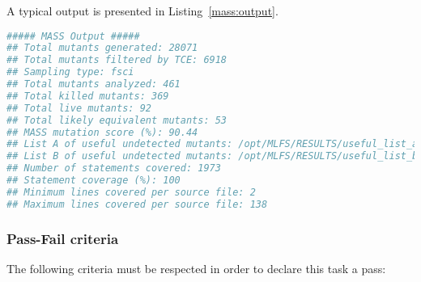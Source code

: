 A typical \MASS output is presented in Listing~\ref{mass:output}.

\begin{lstlisting}[language=bash, label=mass:output, caption=\MASS output.]
##### MASS Output #####
## Total mutants generated: 28071
## Total mutants filtered by TCE: 6918
## Sampling type: fsci
## Total mutants analyzed: 461
## Total killed mutants: 369
## Total live mutants: 92
## Total likely equivalent mutants: 53
## MASS mutation score (%): 90.44
## List A of useful undetected mutants: /opt/MLFS/RESULTS/useful_list_a
## List B of useful undetected mutants: /opt/MLFS/RESULTS/useful_list_b
## Number of statements covered: 1973
## Statement coverage (%): 100
## Minimum lines covered per source file: 2
## Maximum lines covered per source file: 138
\end{lstlisting}

\subsubsection{Pass-Fail criteria}

The following criteria must be respected in order to declare this task a pass:

